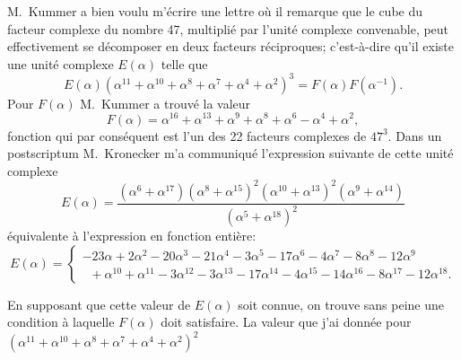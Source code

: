 \documentclass[11pt,a4paper]{article}
\begin{document}
M.~Kummer a bien voulu m'écrire une lettre où il remarque que le cube du facteur complexe du nombre 47, multiplié par l'unité complexe convenable, peut effectivement se décomposer en deux facteurs réciproques; c'est-à-dire qu'il existe une unité complexe $E(\alpha)$ telle que
\[
E(\alpha)(\alpha^{11} + \alpha^{10} + \alpha^{8} + \alpha^{7} + \alpha^{4} + \alpha^{2})^{3} = F(\alpha) F(\alpha^{-1}).
\]
Pour $F(\alpha)$ M.~Kummer a trouvé la valeur
\[
F(\alpha) = \alpha^{16} + \alpha^{13} + \alpha^{9} + \alpha^{8} + \alpha^{6} - \alpha^{4} + \alpha^{2},
\]
fonction qui par conséquent est l'un des 22 facteurs complexes de $47^{3}$. Dans un postscriptum M.~Kronecker m'a communiqué l'expression suivante de cette unité complexe
\[
E(\alpha) = \frac{(\alpha^{6} + \alpha^{17})(\alpha^{8} + \alpha^{15})^{2}(\alpha^{10} + \alpha^{13})^{2}(\alpha^{9} + \alpha^{14})}{(\alpha^{5} + \alpha^{18})^{2}}
\]
équivalente à l'expression en fonction entière:
\[
E(\alpha) =
\begin{cases}
-23\alpha + 2\alpha^{2} - 20\alpha^{3} - 21\alpha^{4} - 3\alpha^{5} - 17\alpha^{6} - 4\alpha^{7} - 8\alpha^{8} - 12\alpha^{9} \\
\;\;{}+ \alpha^{10} + \alpha^{11} - 3\alpha^{12} - 3\alpha^{13} - 17\alpha^{14} - 4\alpha^{15} - 14\alpha^{16} - 8\alpha^{17} - 12\alpha^{18} .
\end{cases}
\]

En supposant que cette valeur de $E(\alpha)$ soit connue, on trouve sans peine une condition à laquelle $F(\alpha)$ doit satisfaire. La valeur que j'ai donnée pour $(\alpha^{11} + \alpha^{10} + \alpha^{8} + \alpha^{7} + \alpha^{4} + \alpha^{2})^{2}$

\setcounter{page}{79}
\end{document}
